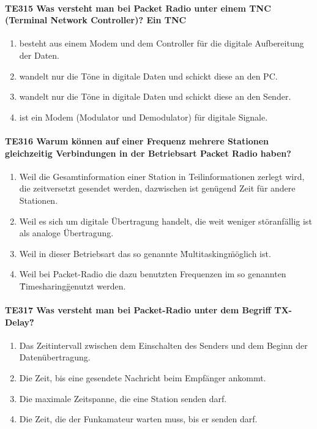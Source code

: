 \documentclass[8pt]{article}
\begin{document}
\begin{enumerate}
\begin{enumerate}[nolistsep,label=\Alph*]
\paragraph*{TE315 Was versteht man bei Packet Radio unter einem TNC (Terminal Network Controller)? Ein TNC}
\begin{enumerate}[nolistsep,label=\Alph*]
\item besteht aus einem Modem und dem Controller für die digitale Aufbereitung der Daten.
\item wandelt nur die Töne in digitale Daten und schickt diese an den PC.
\item wandelt nur die Töne in digitale Daten und schickt diese an den Sender.
\item ist ein Modem (Modulator und Demodulator) für digitale Signale.
\end{enumerate}

\paragraph*{TE316 Warum können auf einer Frequenz mehrere Stationen gleichzeitig Verbindungen in der Betriebsart Packet Radio haben?}
\begin{enumerate}[nolistsep,label=\Alph*]
\item Weil die Gesamtinformation einer Station in Teilinformationen zerlegt wird, die zeitversetzt gesendet werden, dazwischen ist genügend Zeit für andere Stationen.
\item Weil es sich um digitale Übertragung handelt, die weit weniger störanfällig ist als analoge Übertragung.
\item Weil in dieser Betriebsart das so genannte \"Multitasking\" möglich ist.
\item Weil bei Packet-Radio die dazu benutzten Frequenzen im so genannten \"Timesharing\" genutzt werden.
\end{enumerate}

\paragraph*{TE317 Was versteht man bei Packet-Radio unter dem Begriff \"TX-Delay\"?}
\begin{enumerate}[nolistsep,label=\Alph*]
\item Das Zeitintervall zwischen dem Einschalten des Senders und dem Beginn der Datenübertragung. 
\item Die Zeit, bis eine gesendete Nachricht beim Empfänger ankommt.
\item Die maximale Zeitspanne, die eine Station senden darf.
\item Die Zeit, die der Funkamateur warten muss, bis er senden darf.
\end{enumerate}


\end{enumerate}
\end{enumerate}
\end{document}

